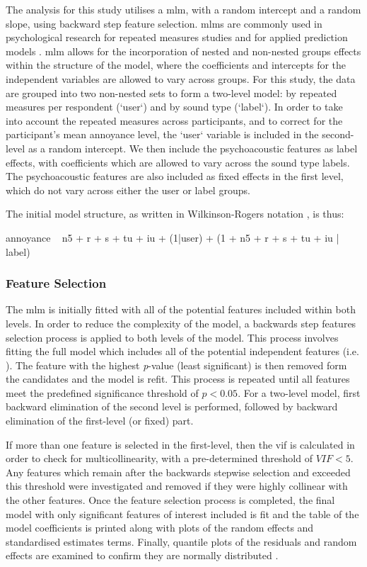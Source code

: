    The analysis for this study utilises a \gls{mlm}, with a random intercept and a random slope, using backward step feature selection. \glspl{mlm} are commonly used in psychological research for repeated measures studies  and for applied prediction models . \gls{mlm} allows for the incorporation of nested and non-nested groups effects within the structure of the model, where the coefficients and intercepts for the independent variables are allowed to vary across groups. For this study, the data are grouped into two non-nested sets to form a two-level model: by repeated measures per respondent (`user`) and by sound type (`label`). In order to take into account the repeated measures across participants, and to correct for the participant's mean annoyance level, the `user` variable is included in the second-level as a random intercept. We then include the psychoacoustic features as label effects, with coefficients which are allowed to vary across the sound type labels. The psychoacoustic features are also included as fixed effects in the first level, which do not vary across either the user or label groups.

   The initial model structure, as written in Wilkinson-Rogers notation , is thus:

   annoyance ~ \gls{n5} + \gls{r} + \gls{s} + \gls{tu} + \gls{iu} + (1|user) + (1 + \gls{n5} + \gls{r} + \gls{s} + \gls{tu} + \gls{iu} | label)

   \subsubsection{Feature Selection}

   The \gls{mlm} is initially fitted with all of the potential features included within both levels. In order to reduce the complexity of the model, a backwards step features selection process is applied to both levels of the model. This process involves fitting the full model which includes all of the potential independent features (i.e. ). The feature with the highest \emph{p}-value (least significant) is then removed form the candidates and the model is refit. This process is repeated until all features meet the predefined significance threshold of $p < 0.05 $. For a two-level model, first backward elimination of the second level is performed, followed by backward elimination of the first-level (or fixed) part.

   If more than one feature is selected in the first-level, then the \gls{vif} is calculated in order to check for multicollinearity, with a pre-determined threshold of $VIF<5$. Any features which remain after the backwards stepwise selection and exceeded this threshold were investigated and removed if they were highly collinear with the other features. Once the feature selection process is completed, the final model with only significant features of interest included is fit and the table of the model coefficients is printed along with plots of the random effects and standardised estimates terms. Finally, quantile plots of the residuals and random effects are examined to confirm they are normally distributed .

